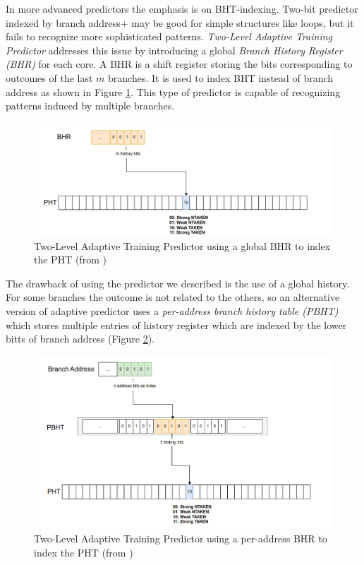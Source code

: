 In more advanced predictors the emphasis is on BHT-indexing. Two-bit predictor indexed by branch address+ may be good for simple structures like loops, but it fails to recognize more sophisticated patterns. \textit{Two-Level Adaptive Training Predictor} addresses this issue by introducing a global \textit{Branch History Register (BHR)} for each core. A BHR is a shift register storing the bits corresponding to outcomes of the last $m$ branches. It is used to index BHT instead of branch address as shown in Figure \ref{fig:bp-two-level}. This type of predictor is capable of recognizing patterns induced by multiple branches.

\begin{figure}
    \includegraphics[width=\textwidth]{figures/bp-two-level.png}
    \caption{Two-Level Adaptive Training Predictor using a global BHR to index the PHT (from \cite{mahling_reverse_2023})}
    \label{fig:bp-two-level}
\end{figure}

The drawback of using the predictor we described is the use of a global history. For some branches the outcome is not related to the others, so an alternative version of adaptive predictor uses a \textit{per-address branch history table (PBHT)} which stores multiple entries of history register which are indexed by the lower bitts of branch address (Figure \ref{fig:bp-two-level-local}).

\begin{figure}
    \includegraphics[width=\textwidth]{figures/bp-two-level-local.png}
    \caption{Two-Level Adaptive Training Predictor using a per-address BHR to index the PHT (from \cite{mahling_reverse_2023})}
    \label{fig:bp-two-level-local}
\end{figure}

